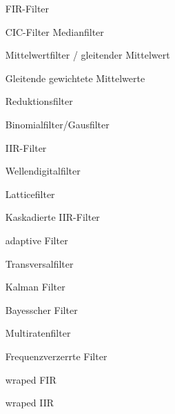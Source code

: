 \documentclass[a4paper,11pt]{article}
\begin{document}
\begin{itemize}
\item[FIR-Filter]

	\subitem CIC-Filter
	\subitem Medianfilter

	\subitem Mittelwertfilter / gleitender Mittelwert

	\subitem Gleitende gewichtete Mittelwerte

	\subitem Reduktionsfilter

	\subitem Binomialfilter/Gausfilter

\item[IIR-Filter]

	\subitem Wellendigitalfilter

\item[Latticefilter]

\item[Kaskadierte IIR-Filter]

\item[adaptive Filter]

\item[Transversalfilter]

\item[Kalman Filter]

\item[Bayesscher Filter]

\item[Multiratenfilter]

\item[Frequenzverzerrte Filter]

\item[wraped FIR]

\item[wraped IIR]
\end{itemize}
		

\end{document}
